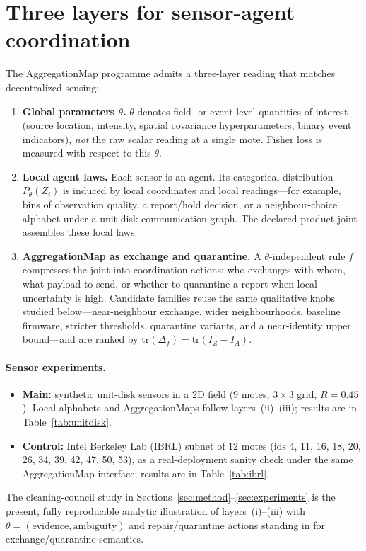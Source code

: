 \documentclass[11pt,a4paper]{article}
\begin{document}
\section{Three layers for sensor-agent coordination}
\label{sec:sensor-layers}

The AggregationMap programme admits a three-layer reading that matches
decentralized sensing:

\begin{enumerate}
  \item[(i)] \textbf{Global parameters $\theta$.}
  $\theta$ denotes field- or event-level quantities of interest (source
  location, intensity, spatial covariance hyperparameters, binary event
  indicators), \emph{not} the raw scalar reading at a single mote. Fisher
  loss is measured with respect to this $\theta$.

  \item[(ii)] \textbf{Local agent laws.}
  Each sensor is an agent. Its categorical distribution $P_\theta(Z_i)$ is
  induced by local coordinates and local readings---for example, bins of
  observation quality, a report/hold decision, or a neighbour-choice alphabet
  under a unit-disk communication graph. The declared product joint assembles
  these local laws.

  \item[(iii)] \textbf{AggregationMap as exchange and quarantine.}
  A $\theta$-independent rule $f$ compresses the joint into coordination
  actions: who exchanges with whom, what payload to send, or whether to
  quarantine a report when local uncertainty is high. Candidate families reuse
  the same qualitative knobs studied below---near-neighbour exchange, wider
  neighbourhoods, baseline firmware, stricter thresholds, quarantine variants,
  and a near-identity upper bound---and are ranked by
  $\mathrm{tr}(\Delta_f)=\mathrm{tr}(I_Z-I_A)$.
\end{enumerate}

\paragraph{Sensor experiments.}
\begin{itemize}
  \item \textbf{Main:} synthetic unit-disk sensors in a 2D field ($9$ motes,
  $3\times3$ grid, $R=0.45$). Local alphabets and AggregationMaps follow
  layers~(ii)--(iii); results are in Table~\ref{tab:unitdisk}.
  \item \textbf{Control:} Intel Berkeley Lab (IBRL) subnet of $12$ motes
  (ids 4, 11, 16, 18, 20, 26, 34, 39, 42, 47, 50, 53), as a real-deployment sanity check under the same
  AggregationMap interface; results are in Table~\ref{tab:ibrl}.
\end{itemize}
The cleaning-council study in Sections~\ref{sec:method}--\ref{sec:experiments}
is the present, fully reproducible analytic illustration of layers~(i)--(iii)
with $\theta=(\mathrm{evidence},\mathrm{ambiguity})$ and repair/quarantine
actions standing in for exchange/quarantine semantics.
\end{document}
